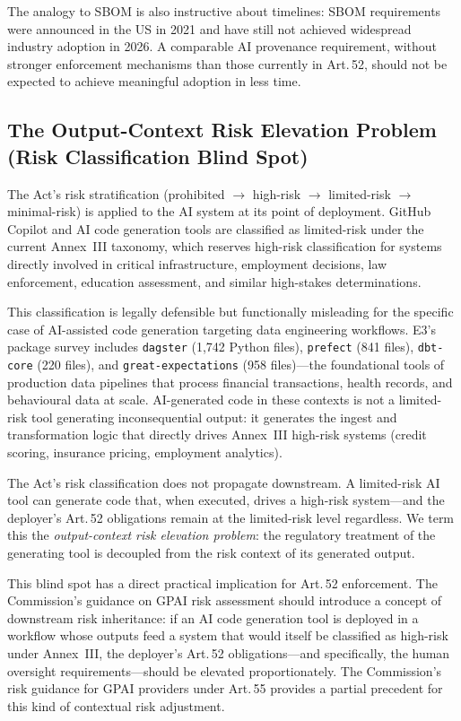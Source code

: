 \documentclass[conference]{IEEEtran}
\begin{document}
The analogy to SBOM is also instructive about timelines: SBOM
requirements were announced in the US in 2021 and have still not
achieved widespread industry adoption in 2026.  A comparable AI
provenance requirement, without stronger enforcement mechanisms than
those currently in Art.\,52, should not be expected to achieve
meaningful adoption in less time.

\subsection{The Output-Context Risk Elevation Problem (Risk
Classification Blind Spot)}

The Act's risk stratification (prohibited $\to$ high-risk $\to$
limited-risk $\to$ minimal-risk) is applied to the AI system at its
point of deployment.  GitHub Copilot and AI code generation tools are
classified as limited-risk under the current Annex~III taxonomy, which
reserves high-risk classification for systems directly involved in
critical infrastructure, employment decisions, law enforcement, education
assessment, and similar high-stakes determinations.

This classification is legally defensible but functionally misleading
for the specific case of AI-assisted code generation targeting data
engineering workflows.  E3's package survey includes \texttt{dagster}
(1,742 Python files), \texttt{prefect} (841 files), \texttt{dbt-core}
(220 files), and \texttt{great-expectations} (958 files)---the
foundational tools of production data pipelines that process financial
transactions, health records, and behavioural data at scale.
AI-generated code in these contexts is not a limited-risk tool generating
inconsequential output: it generates the ingest and transformation logic
that directly drives Annex~III high-risk systems (credit scoring,
insurance pricing, employment analytics).

The Act's risk classification does not propagate downstream.  A
limited-risk AI tool can generate code that, when executed, drives a
high-risk system---and the deployer's Art.\,52 obligations remain at the
limited-risk level regardless.  We term this the \emph{output-context
risk elevation problem}: the regulatory treatment of the generating tool
is decoupled from the risk context of its generated output.

This blind spot has a direct practical implication for Art.\,52
enforcement.  The Commission's guidance on GPAI risk assessment should
introduce a concept of downstream risk inheritance: if an AI code
generation tool is deployed in a workflow whose outputs feed a system
that would itself be classified as high-risk under Annex~III, the
deployer's Art.\,52 obligations---and specifically, the human oversight
requirements---should be elevated proportionately.  The Commission's
risk guidance for GPAI providers under Art.\,55 provides a partial
precedent for this kind of contextual risk adjustment.
\end{document}
